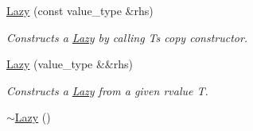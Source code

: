 \begin{DoxyCompactItemize}
\hyperlink{classlazy_1_1_lazy_a7ef49d0ccbdab765ace96ff9daa31196}{Lazy} (const value\+\_\+type \&rhs)
\begin{DoxyCompactList}\small\item\em Constructs a {\ttfamily \hyperlink{classlazy_1_1_lazy}{Lazy}} by calling {\ttfamily T\textquotesingle{}s} copy constructor. \end{DoxyCompactList}\item 
\hyperlink{classlazy_1_1_lazy_a9f011fefe5be8c2753593c38a7417961}{Lazy} (value\+\_\+type \&\&rhs)
\begin{DoxyCompactList}\small\item\em Constructs a {\ttfamily \hyperlink{classlazy_1_1_lazy}{Lazy}} from a given rvalue {\ttfamily T}. \end{DoxyCompactList}\item 
\hyperlink{classlazy_1_1_lazy_aae2c22d0a101992ded32872d252b93fb}{$\sim$\+Lazy} ()\hypertarget{classlazy_1_1_lazy_aae2c22d0a101992ded32872d252b93fb}{}\label{classlazy_1_1_lazy_aae2c22d0a101992ded32872d252b93fb}


\end{DoxyCompactItemize}
